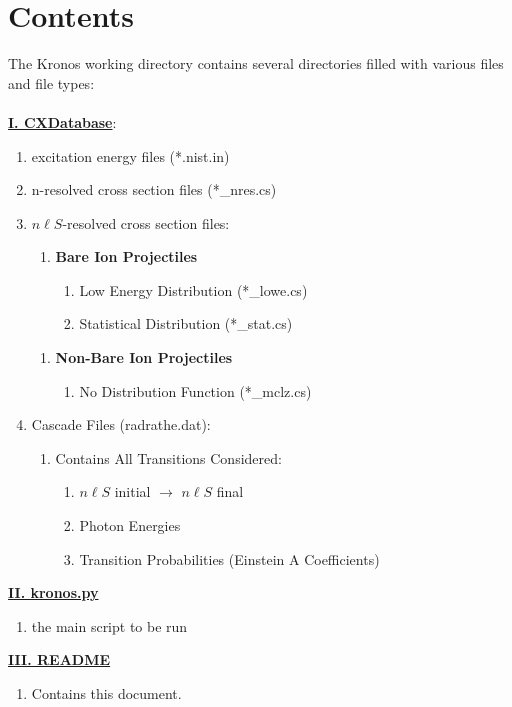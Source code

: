\documentclass[twocolumn, prb, amsmath,amssymb,amsfonts]{revtex4}
\begin{document}
\section{Contents}
The Kronos working directory contains several directories filled with various files and file types:\\
\\
\underline{\textbf{I. CXDatabase}}:
\begin{enumerate}
\item excitation energy files (*.nist.in)
\item n-resolved cross section files (*\_nres.cs)
\item $n \ell S$-resolved cross section files:
\begin{enumerate}
\item \textbf{Bare Ion Projectiles}
\begin{enumerate}
\item Low Energy Distribution (*\_lowe.cs)
\item Statistical Distribution (*\_stat.cs)
\end{enumerate}
\end{enumerate}
\begin{enumerate}
\item \textbf{Non-Bare Ion Projectiles}
\begin{enumerate}
\item No Distribution Function (*\_mclz.cs)
\end{enumerate}
\end{enumerate}
\item Cascade Files (radrathe.dat):
\begin{enumerate}
\item Contains All Transitions Considered:
\begin{enumerate}
\item $n \ell S$ initial $\rightarrow$ $n\ell S$ final
\item Photon Energies
\item Transition Probabilities (Einstein A Coefficients)
\end{enumerate}
\end{enumerate}
\end{enumerate}
\vspace*{0.6 cm}
\underline{\textbf{II. kronos.py}}
\begin{enumerate}
\item the main script to be run
\end{enumerate}
\underline{\textbf{III. README}}
\begin{enumerate}
\item Contains this document.
\end{enumerate}
\end{document}
